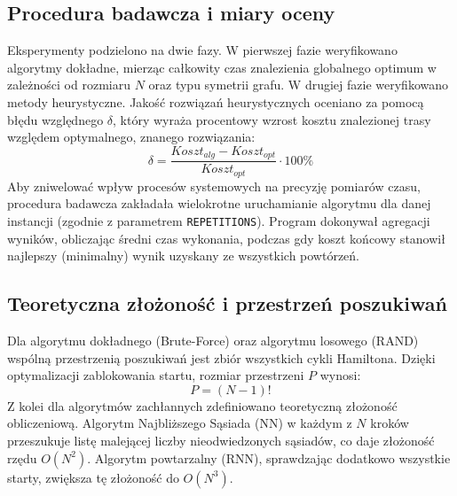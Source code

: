 \documentclass[conference]{IEEEtran}
\begin{document}
        \subsection{Procedura badawcza i miary oceny}
            Eksperymenty podzielono na dwie fazy. W pierwszej fazie weryfikowano algorytmy dokładne, mierząc całkowity czas znalezienia globalnego optimum w zależności od rozmiaru $N$ oraz typu symetrii grafu. W drugiej fazie weryfikowano metody heurystyczne. 
            Jakość rozwiązań heurystycznych oceniano za pomocą błędu względnego $\delta$, który wyraża procentowy wzrost kosztu znalezionej trasy względem optymalnego, znanego rozwiązania:
            \begin{equation}
                \delta = \frac{Koszt_{alg} - Koszt_{opt}}{Koszt_{opt}} \cdot 100\%
            \end{equation}
            Aby zniwelować wpływ procesów systemowych na precyzję pomiarów czasu, procedura badawcza zakładała wielokrotne uruchamianie algorytmu dla danej instancji (zgodnie z parametrem \texttt{REPETITIONS}). Program dokonywał agregacji wyników, obliczając średni czas wykonania, podczas gdy koszt końcowy stanowił najlepszy (minimalny) wynik uzyskany ze wszystkich powtórzeń.
        \subsection{Teoretyczna złożoność i przestrzeń poszukiwań}
            Dla algorytmu dokładnego (Brute-Force) oraz algorytmu losowego (RAND) wspólną przestrzenią poszukiwań jest zbiór wszystkich cykli Hamiltona. Dzięki optymalizacji zablokowania startu, rozmiar przestrzeni $P$ wynosi:
            \begin{equation}
                P = (N - 1)!
            \end{equation}
            Z kolei dla algorytmów zachłannych zdefiniowano teoretyczną złożoność obliczeniową. Algorytm Najbliższego Sąsiada (NN) w każdym z $N$ kroków przeszukuje listę malejącej liczby nieodwiedzonych sąsiadów, co daje złożoność rzędu $O(N^2)$. Algorytm powtarzalny (RNN), sprawdzając dodatkowo wszystkie starty, zwiększa tę złożoność do $O(N^3)$.
\end{document}
